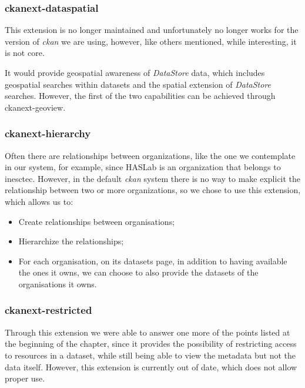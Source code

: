   \subsubsection{ckanext-dataspatial}
  
  This extension is no longer maintained and unfortunately no longer works for the version of \textit{\gls{ckan}} we are using, however, like others mentioned, while interesting, it is not core. 

  It would provide geospatial awareness of \textit{DataStore} data, which includes geospatial searches within datasets and the spatial extension of \textit{DataStore} searches. However, the first of the two capabilities can be achieved through ckanext-geoview.
  
  \subsubsection{ckanext-hierarchy}
  
 Often there are relationships between organizations, like the one we contemplate in our system, for example, since HASLab is an organization that belongs to \gls{inesctec}. However, in the default \textit{\gls{ckan}} system there is no way to make explicit the relationship between two or more organizations, so we chose to use this extension, which allows us to:
  
  \begin{itemize}
      \item Create relationships between organisations;
      \item Hierarchize the relationships;
      \item For each organisation, on its datasets page, in addition to having available the ones it owns, we can choose to also provide the datasets of the organisations it owns.
  \end{itemize}
  
  \subsubsection{ckanext-restricted}
  
  Through this extension we were able to answer one more of the points listed at the beginning of the chapter, since it provides the possibility of restricting access to resources in a dataset, while still being able to view the metadata but not the data itself. However, this extension is currently out of date, which does not allow proper use.
  
